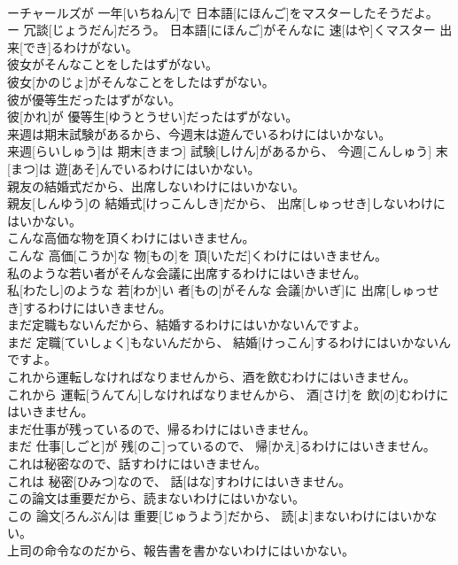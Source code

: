 \documentclass[8pt]{extreport}
\begin{document}
\begin{CJK}{UTF8}{min}
\\	ーチャールズが 一年[いちねん]で 日本語[にほんご]をマスターしたそうだよ。 ー 冗談[じょうだん]だろう。 日本語[にほんご]がそんなに 速[はや]くマスター 出来[でき]るわけがない。
\\	彼女がそんなことをしたはずがない。	
\\	彼女[かのじょ]がそんなことをしたはずがない。
\\	彼が優等生だったはずがない。	
\\	彼[かれ]が 優等生[ゆうとうせい]だったはずがない。
\\	来週は期末試験があるから、今週末は遊んでいるわけにはいかない。	
\\	来週[らいしゅう]は 期末[きまつ] 試験[しけん]があるから、 今週[こんしゅう] 末[まつ]は 遊[あそ]んでいるわけにはいかない。
\\	親友の結婚式だから、出席しないわけにはいかない。	
\\	親友[しんゆう]の 結婚式[けっこんしき]だから、 出席[しゅっせき]しないわけにはいかない。
\\	こんな高価な物を頂くわけにはいきません。	
\\	こんな 高価[こうか]な 物[もの]を 頂[いただ]くわけにはいきません。
\\	私のような若い者がそんな会議に出席するわけにはいきません。	
\\	私[わたし]のような 若[わか]い 者[もの]がそんな 会議[かいぎ]に 出席[しゅっせき]するわけにはいきません。
\\	まだ定職もないんだから、結婚するわけにはいかないんですよ。	
\\	まだ 定職[ていしょく]もないんだから、 結婚[けっこん]するわけにはいかないんですよ。
\\	これから運転しなければなりませんから、酒を飲むわけにはいきません。	
\\	これから 運転[うんてん]しなければなりませんから、 酒[さけ]を 飲[の]むわけにはいきません。
\\	まだ仕事が残っているので、帰るわけにはいきません。	
\\	まだ 仕事[しごと]が 残[のこ]っているので、 帰[かえ]るわけにはいきません。
\\	これは秘密なので、話すわけにはいきません。	
\\	これは 秘密[ひみつ]なので、 話[はな]すわけにはいきません。
\\	この論文は重要だから、読まないわけにはいかない。	
\\	この 論文[ろんぶん]は 重要[じゅうよう]だから、 読[よ]まないわけにはいかない。
\\	上司の命令なのだから、報告書を書かないわけにはいかない。	

\end{CJK}
\end{document}
